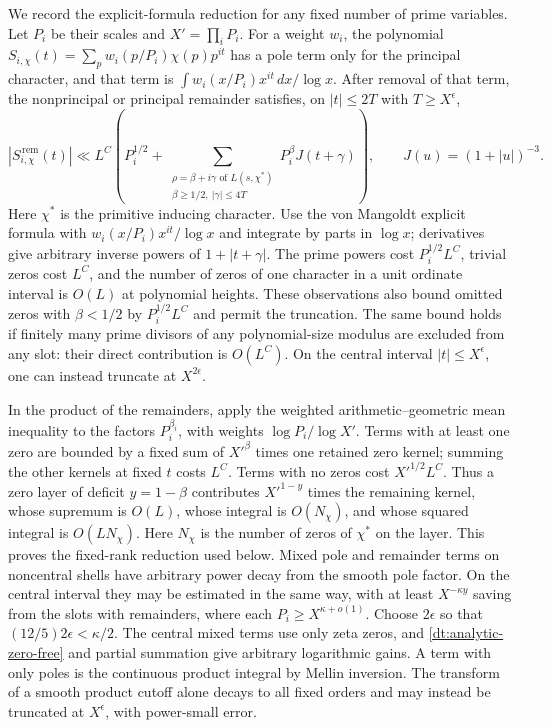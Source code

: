 \documentclass[11pt,a4paper]{article}
\theoremstyle{paperplain}
\numberwithin{equation}{section}
\begin{document}
We record the explicit-formula reduction for any fixed number of
prime variables. Let \(P_i\) be their scales and \(X'=\prod_i P_i\).
For a weight \(w_i\), the polynomial
\(S_{i,\chi}(t)=\sum_p w_i(p/P_i)\chi(p)p^{it}\) has a pole term only
for the principal character, and that term is
\(\int w_i(x/P_i)x^{it}\,dx/\log x\). After removal of that term,
the nonprincipal or principal remainder satisfies, on \(|t|\leq 2T\)
with \(T\ge X^\epsilon\),
\[
 |S_{i,\chi}^{\,\mathrm{rem}}(t)|\ll L^{C}
 \left(P_i^{1/2}+
   \sum_{\substack{\rho=\beta+i\gamma\text{ of }L(s,\chi^*)\\
                    \beta\ge1/2,\ |\gamma|\le4T}}
           P_i^\beta J(t+\gamma)\right),\qquad J(u)=(1+|u|)^{-3}.
\]
Here \(\chi^*\) is the primitive inducing character. Use the
von Mangoldt explicit formula with \(w_i(x/P_i)x^{it}/\log x\)
and integrate by parts in \(\log x\); derivatives give arbitrary
inverse powers of \(1+|t+\gamma|\). The prime powers cost
\(P_i^{1/2}L^C\), trivial zeros cost \(L^C\), and the number of
zeros of one character in a unit ordinate interval is \(O(L)\)
at polynomial heights. These observations also bound omitted
zeros with \(\beta<1/2\) by \(P_i^{1/2}L^C\) and permit the
truncation. The same bound holds if finitely many prime divisors
of any polynomial-size modulus are excluded from any slot:
their direct contribution is \(O(L^C)\). On the central interval
\(|t|\le X^\epsilon\), one can instead truncate at \(X^{2\epsilon}\).

In the product of the remainders, apply the weighted arithmetic--geometric
mean inequality to the factors \(P_i^{\beta_i}\), with weights
\(\log P_i/\log X'\). Terms with at least one zero are bounded by a fixed
sum of \(X'^\beta\) times one retained zero kernel; summing the other
kernels at fixed \(t\) costs \(L^C\). Terms with no zeros cost \(X'^{1/2}L^C\).
Thus a zero layer of deficit \(y=1-\beta\) contributes \(X'^{1-y}\)
times the remaining kernel, whose supremum is \(O(L)\), whose integral
is \(O(N_\chi)\), and whose squared integral is \(O(LN_\chi)\).
Here \(N_\chi\) is the number of zeros of \(\chi^*\) on the layer.
This proves the fixed-rank reduction used below. Mixed pole and remainder
terms on noncentral shells have arbitrary power decay from the smooth
pole factor. On the central interval they may be estimated in the same
way, with at least \(X^{-\kappa y}\) saving from the slots with remainders,
where each \(P_i\ge X^{\kappa+o(1)}\). Choose \(2\epsilon\) so that
\((12/5)2\epsilon<\kappa/2\). The central mixed terms use only zeta
zeros, and \eqref{dt:analytic-zero-free} and partial summation give
arbitrary logarithmic gains. A term with only poles is the continuous
product integral by Mellin inversion. The transform of a smooth
product cutoff alone decays to all fixed orders and may instead be
truncated at \(X^\epsilon\), with power-small error.
\end{document}
